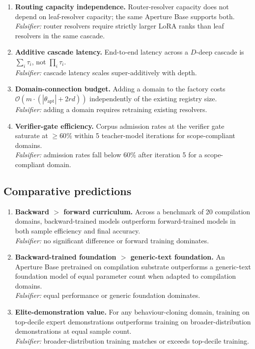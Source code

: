 \documentclass[twocolumn,11pt,a4paper]{article}
\begin{document}
\begin{enumerate}[leftmargin=*,itemsep=3pt,start=6]
\item \textbf{Routing capacity independence.} Router-resolver capacity does not depend on leaf-resolver capacity; the same Aperture Base supports both.\\
\emph{Falsifier:} router resolvers require strictly larger LoRA ranks than leaf resolvers in the same cascade.

\item \textbf{Additive cascade latency.} End-to-end latency across a $D$-deep cascade is $\sum_i \tau_i$, not $\prod_i \tau_i$.\\
\emph{Falsifier:} cascade latency scales super-additively with depth.

\item \textbf{Domain-connection budget.} Adding a domain to the factory costs $\mathcal{O}(m \cdot (|\theta_{\mathrm{apt}}| + 2rd))$ independently of the existing registry size.\\
\emph{Falsifier:} adding a domain requires retraining existing resolvers.

\item \textbf{Verifier-gate efficiency.} Corpus admission rates at the verifier gate saturate at $\geq 60\%$ within 5 teacher-model iterations for scope-compliant domains.\\
\emph{Falsifier:} admission rates fall below 60\% after iteration 5 for a scope-compliant domain.
\end{enumerate}

\subsection{Comparative predictions}

\begin{enumerate}[leftmargin=*,itemsep=3pt,start=10]
\item \textbf{Backward $>$ forward curriculum.} Across a benchmark of 20 compilation domains, backward-trained models outperform forward-trained models in both sample efficiency and final accuracy.\\
\emph{Falsifier:} no significant difference or forward training dominates.

\item \textbf{Backward-trained foundation $>$ generic-text foundation.} An Aperture Base pretrained on compilation substrate outperforms a generic-text foundation model of equal parameter count when adapted to compilation domains.\\
\emph{Falsifier:} equal performance or generic foundation dominates.

\item \textbf{Elite-demonstration value.} For any behaviour-cloning domain, training on top-decile expert demonstrations outperforms training on broader-distribution demonstrations at equal sample count.\\
\emph{Falsifier:} broader-distribution training matches or exceeds top-decile training.
\end{enumerate}
\end{document}
